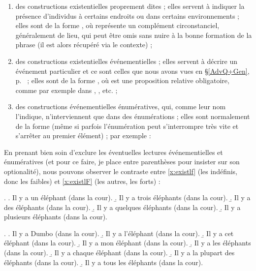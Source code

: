 \begin{enumerate}
\item des constructions existentielles proprement dites ; elles servent à indiquer la présence d'individus à certains endroits ou dans certains environnements ; elles sont de la forme , où   représente un complément circonstanciel, généralement de lieu, qui peut être omis sans nuire à la bonne formation de la phrase (il est alors récupéré via le contexte) ;
\item des constructions existentielles événementielles ; elles servent à décrire un événement particulier et ce sont celles que nous avons vues en \S\ref{AdvQ+Gen}, p.~\pageref{xilya} ; elles sont de la forme , où  est une proposition relative obligatoire, comme par exemple dans , , etc. ;
\item des constructions événementielles énumératives, qui, comme leur nom l'indique, n'interviennent que dans des énumérations ; elles sont normalement de la forme  (même si parfois l'énumération peut s'interrompre très vite et s'arrêter au premier élément) ; par exemple : 
\end{enumerate}

\largerpage[-1]

En prenant bien soin d'exclure les éventuelles lectures événementielles et énumératives (et pour ce faire, je place  entre parenthèses pour insister sur son optionalité), nous pouvons observer le contraste entre \ref{x:existlf} (les indéfinis, donc les faibles) et \ref{x:existlF} (les autres, les forts) : 

\ex.  \label{x:existlf}
\a. Il y a un éléphant (dans la cour).
\b. Il y a trois éléphants (dans la cour).
\b. Il y a des éléphants (dans la cour).
\b. Il y a quelques éléphants (dans la cour).
\b. Il y a plusieurs éléphants (dans la cour).

\ex.  \label{x:existlF}
\a. \juge{\uurgh} Il y a Dumbo (dans la cour).
\b. \juge{\uurgh} Il y a  l'éléphant (dans la cour).
\b. \juge{\uurgh} Il y a cet éléphant (dans la cour).
\b. \juge{\uurgh} Il y a mon éléphant (dans la cour).
\b. \juge{\uurgh} Il y a les éléphants (dans la cour).
\b. \juge{\uurgh} Il y a chaque éléphant (dans la cour).
\b. \juge{\uurgh} Il y a la plupart des éléphants (dans la cour).
\b. \juge{\uurgh} Il y a tous les éléphants (dans la cour).


